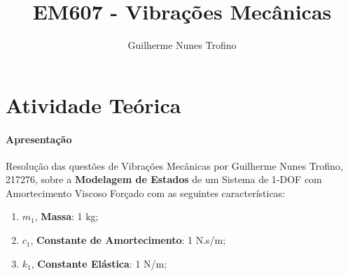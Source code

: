 \documentclass{article}
\title{EM607 - Vibrações Mecânicas}
\author{Guilherme Nunes Trofino}
\begin{document}
    \maketitle
\newpage

\section{Atividade Teórica}
\paragraph{Apresentação}Resolução das questões de Vibrações Mecânicas por Guilherme Nunes Trofino, 217276, sobre a \textbf{Modelagem de Estados} de um Sistema de 1-DOF com Amortecimento Viscoso Forçado com as seguintes características:
\begin{enumerate}
    \item $m_1$, \textbf{Massa}: 1 kg;
    \item $c_1$, \textbf{Constante de Amortecimento}: 1 N.s/m;
    \item $k_1$, \textbf{Constante Elástica}: 1 N/m;
\end{enumerate}
\end{document}

